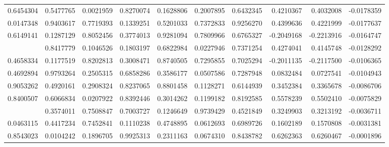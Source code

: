 \documentclass[AMA,STIX1COL,]{WileyNJD-v2}
\begin{document}
\begin{landscape}
\begin{longtable}[t]{rrrrrrrrrr}
0.6454304 & 0.5477765 & 0.0021959 & 0.8270074 & 0.1628806 & 0.2007895 & 0.6432345 & 0.4210367 & 0.4032008 & -0.0178359\\
0.0147348 & 0.9403617 & 0.7719393 & 0.1339251 & 0.5201033 & 0.7372833 & 0.9256270 & 0.4399636 & 0.4221999 & -0.0177637\\
0.6149141 & 0.1287129 & 0.8052456 & 0.3774013 & 0.9281094 & 0.7809966 & 0.6765327 & -0.2049168 & -0.2213916 & -0.0164747\\
\addlinespace
0.6318831 & 0.8417779 & 0.1046526 & 0.1803197 & 0.6822984 & 0.0227946 & 0.7371254 & 0.4274041 & 0.4145748 & -0.0128292\\
0.4658334 & 0.1177519 & 0.8202813 & 0.3008471 & 0.8740505 & 0.7295855 & 0.7025294 & -0.2011135 & -0.2117500 & -0.0106365\\
0.4692894 & 0.9793264 & 0.2505315 & 0.6858286 & 0.3586177 & 0.0507586 & 0.7287948 & 0.0832484 & 0.0727541 & -0.0104943\\
0.9053262 & 0.4920161 & 0.2908324 & 0.8237065 & 0.8801458 & 0.1128271 & 0.6144939 & 0.3452384 & 0.3365678 & -0.0086706\\
0.8400507 & 0.6066834 & 0.0207922 & 0.8392446 & 0.3014262 & 0.1199182 & 0.8192585 & 0.5578239 & 0.5502410 & -0.0075829\\
\addlinespace
0.2986999 & 0.3574011 & 0.7508847 & 0.7003727 & 0.1246649 & 0.9739429 & 0.4521849 & 0.3249903 & 0.3213192 & -0.0036711\\
0.0463115 & 0.4417234 & 0.7452841 & 0.1110238 & 0.4748895 & 0.0612693 & 0.6989726 & 0.1602189 & 0.1570808 & -0.0031381\\
0.8543023 & 0.0104242 & 0.1896705 & 0.9925313 & 0.2311163 & 0.0674310 & 0.8438782 & 0.6262363 & 0.6260467 & -0.0001896\\*
\end{longtable}
\end{landscape}
\endgroup{}
\end{document}
